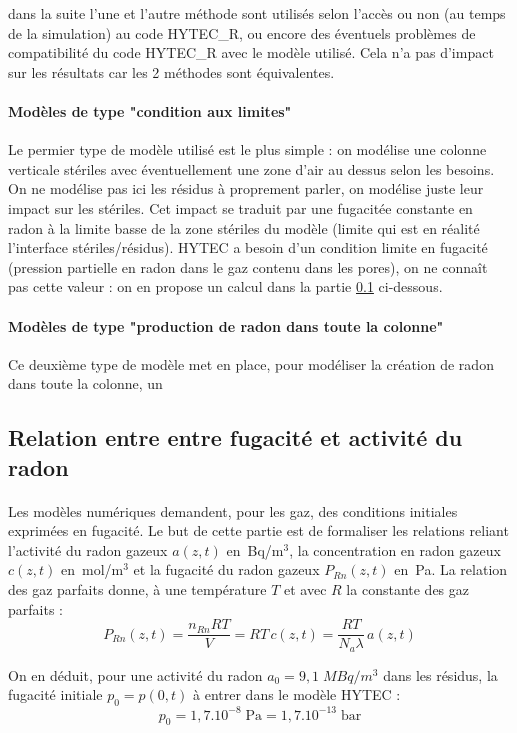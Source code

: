 \documentclass{article}
\begin{document}
dans la suite l'une et l'autre méthode sont utilisés selon l'accès ou non (au temps de la simulation) au code HYTEC\_R, ou encore des éventuels problèmes de compatibilité du code HYTEC\_R avec le modèle utilisé. Cela n'a pas d'impact sur les résultats car les 2 méthodes sont équivalentes.
\paragraph{Modèles de type "condition aux limites" } Le permier type de modèle utilisé est le plus simple : on modélise une colonne verticale stériles avec éventuellement une zone d'air au dessus selon les besoins. On ne modélise pas ici les résidus à proprement parler, on modélise juste leur impact sur les stériles. Cet impact se traduit par une fugacitée constante en radon à la limite basse de la zone stériles du modèle (limite qui est en réalité l'interface stériles/résidus). HYTEC a besoin d'un condition limite en fugacité (pression partielle en radon dans le gaz contenu dans les pores), on ne connaît pas cette valeur : on en propose un calcul dans la partie \ref{annexe:fug_act} ci-dessous.

\paragraph{Modèles de type "production de radon dans toute la colonne"} Ce deuxième type de modèle met en place, pour modéliser la création de radon dans toute la colonne, un

\subsection{Relation entre entre fugacité et activité du radon}
\label{annexe:fug_act}
\paragraph{} Les modèles numériques demandent, pour les gaz, des conditions initiales exprimées en fugacité. Le but de cette partie est de formaliser les relations reliant l’activité du radon gazeux $a(z,t)$ en~Bq/m$^3$, la concentration en radon gazeux $c(z,t)$ en~mol/m$^3$ et la fugacité du radon gazeux $P_{Rn} (z,t)$ en~Pa. La relation des gaz parfaits donne, à une température $T$ et avec $R$ la constante des gaz parfaits :
$$
P_{Rn} (z,t)=\frac{n_{Rn} RT}{V}=RT\,c(z,t)=\frac{RT}{N_a \lambda}\, a(z,t)
$$

On en déduit, pour une activité du radon $a_0=9,1 \; MBq/m^3$ dans les résidus, la fugacité initiale $p_0=p(0,t)$ à entrer dans le modèle HYTEC :
$$
p_0=1,7 .10^{-8} \; \text{Pa}=1,7 .10^{-13} \; \text{bar}
$$
\end{document}
